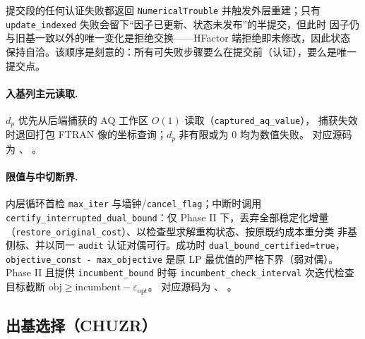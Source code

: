 \begin{boundarynote}
提交段的任何认证失败都返回 \texttt{NumericalTrouble} 并触发外层重建；只有
\texttt{update\_indexed} 失败会留下``因子已更新、状态未发布''的半提交，但此时
因子仍与旧基一致以外的唯一变化是拒绝交换——HFactor 端拒绝即未修改，因此状态
保持自洽。该顺序是刻意的：所有可失败步骤要么在提交前（认证），要么是唯一提交点。
\end{boundarynote}

\paragraph{入基列主元读取.}
$d_p$ 优先从后端捕获的 AQ 工作区 $O(1)$ 读取（\texttt{captured\_aq\_value}），
捕获失效时退回打包 FTRAN 像的坐标查询；$d_p$ 非有限或为 $0$ 均为数值失败。
对应源码为 、
。

\paragraph{限值与中切断界.}
内层循环首检 \texttt{max\_iter} 与墙钟/\texttt{cancel\_flag}；中断时调用
\texttt{certify\_interrupted\_dual\_bound}：仅 Phase II 下，丢弃全部稳定化增量
（\texttt{restore\_original\_cost}）、以检查型求解重构状态、按原既约成本重分类
非基侧标、并以同一 \texttt{audit} 认证对偶可行。成功时
\texttt{dual\_bound\_certified=true}，\texttt{objective\_const - max\_objective}
是原 LP 最优值的严格下界（弱对偶）。Phase II 且提供
\texttt{incumbent\_bound} 时每 \texttt{incumbent\_check\_interval} 次迭代检查
目标截断 $\mathrm{obj} \ge \mathrm{incumbent} - \varepsilon_{\text{opt}}$。
对应源码为 、
。

\subsection{出基选择（CHUZR）}
\label{subsec:engine-lp-chuzr}

